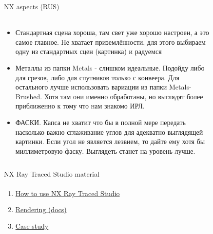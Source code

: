 \documentclass[aspectratio=169]{beamer}
\begin{document}
\begin{frame}[t]{NX aspects (RUS)}
\framesubtitle{}
\begin{columns}[T,onlytextwidth]
    \begin{column}{0.69\textwidth}
        \begin{itemize}
            \scriptsize
            \item Стандартная сцена хороша, там свет уже хорошо настроен, а это самое главное. Не хватает приземлённости, для этого выбираем одну из стандартных сцен (картинка) и радуемся
            \item Металлы из папки Metals - слишком идеальные. Подойду либо для срезов, либо для спутников только с конвеера. Для остального лучше использовать вариации из папки Metals-Brushed. Хотя там они именно обработаны, но выглядят более приближенно к тому что нам знакомо ИРЛ.
            \item ФАСКИ. Капса не хватит что бы в полной мере передать насколько важно сглаживание углов для адекватно выглядящей картинки. Если угол не является лезвием, то дайте ему хотя бы миллиметровую фаску. Выглядеть станет на уровень лучше.
        \end{itemize}
    \end{column}
    \begin{column}{0.29\textwidth}
        \begin{figure}[H]
            \centering\includegraphics[height=5.5cm,width=1\textwidth,keepaspectratio]{standard_scence.jpg}
            \label{fig:standard_scence.jpg}
        \end{figure}
    \end{column}
\end{columns}
\end{frame}

\begin{frame}[t]{NX Ray Traced Studio material}
\framesubtitle{}
    \begin{enumerate}
        \item \href{https://youtu.be/uyGHuxEY5Gk}{How to use NX Ray Traced Studio}
        \item \href{https://docs.sw.siemens.com/en-US/doc/209349590/PL20200605195244930.viewing_rendering/xid1219739}{Rendering (docs)}
        \item \href{https://youtu.be/qPT449FupKU}{Case study}
    \end{enumerate}
\end{frame}
\end{document}
